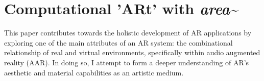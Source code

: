 


\section{Computational 'ARt' with \textit{area\textasciitilde{}}} \label{sec: area-intro-area}
This paper contributes towards the holistic development of AR applications by exploring one of the main attributes of an AR system: the combinational relationship of real and virtual environments, specifically within audio augmented reality (AAR). In doing so, I attempt to form a deeper understanding of AR's aesthetic and material capabilities as an artistic medium.

